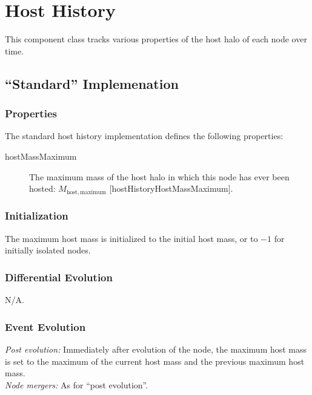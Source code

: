 \section{Host History}

This component class tracks various properties of the host halo of each \gls{node} over time.

\subsection{``Standard'' Implemenation}

\subsubsection{Properties}

The standard host history implementation defines the following properties:
\begin{description}
 \item [{\normalfont \ttfamily hostMassMaximum}] The maximum mass of the host halo in which this node has ever been hosted: $M_\mathrm{host, maximum}$ [{\normalfont \ttfamily hostHistoryHostMassMaximum}].
\end{description}

\subsubsection{Initialization}

The maximum host mass is initialized to the initial host mass, or to $-1$ for initially isolated nodes.

\subsubsection{Differential Evolution}

N/A.

\subsubsection{Event Evolution}

\noindent\emph{Post evolution:} Immediately after evolution of the node, the maximum host mass is set to the maximum of the current host mass and the previous maximum host mass.\\

\noindent\emph{Node mergers:} As for ``post evolution''.\\

